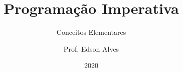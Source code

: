 \title{Programação Imperativa}
\subtitle{Conceitos Elementares}
\date{2020}
\author{Prof. Edson Alves}
